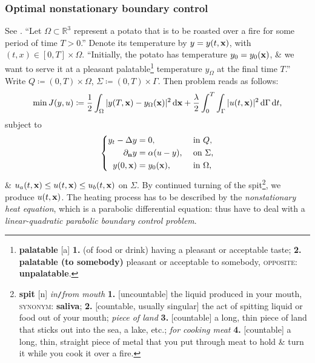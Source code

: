 \documentclass[oneside]{book}
\numberwithin{equation}{section}
\begin{document}
\subsubsection{Optimal nonstationary boundary control}
See \cite[pp. 5--6]{Troltzsch2010}. ``Let $\Omega\subset\mathbb{R}^3$ represent a potato that is to be roasted over a fire for some period of time $T > 0$.'' Denote its temperature by $y = y(t,{\bf x})$, with $(t,x)\in[0,T]\times\Omega$. ``Initially, the potato has temperature $y_0 = y_0({\bf x})$, \& we want to serve it at a pleasant palatable\footnote{\textbf{palatable} [a] \textbf{1.} (of food or drink) having a pleasant or acceptable taste; \textbf{2.} \textbf{palatable (to somebody)} pleasant or acceptable to somebody, \textsc{opposite}: \textbf{unpalatable}.} temperature $y_\Omega$ at the final time $T$.'' Write $Q\coloneqq(0,T)\times\Omega$, $\Sigma\coloneqq(0,T)\times\Gamma$. Then problem reads as follows:
\begin{align*}
	\min J(y,u)\coloneqq\frac{1}{2}\int_\Omega |y(T,{\bf x}) - y_\Omega({\bf x})|^2\,{\rm d}{\bf x} + \frac{\lambda}{2}\int_0^T\int_\Gamma |u(t,{\bf x})|^2\,{\rm d}\Gamma\,{\rm d}t,
\end{align*}
subject to
\begin{equation*}
	\left\{\begin{split}
		y_t - \Delta y &= 0,&&\mbox{ in } Q,\\
		\partial_{\bf n}y &= \alpha(u - y),&&\mbox{ on }\Sigma,\\
		y(0,{\bf x}) &= y_0({\bf x}),&&\mbox{ in }\Omega,
	\end{split}\right.
\end{equation*}
\& $u_a(t,{\bf x})\le u(t,{\bf x})\le u_b(t,{\bf x})$ on $\Sigma$. By continued turning of the spit\footnote{\textbf{spit} [n] \textit{in}\texttt{/}\textit{from mouth} \textbf{1.} [uncountable] the liquid produced in your mouth, \textsc{synonym}: \textbf{saliva}; \textbf{2.} [countable, usually singular] the act of spitting liquid or food out of your mouth; \textit{piece of land} \textbf{3.} [countable] a long, thin piece of land that sticks out into the sea, a lake, etc.; \textit{for cooking meat} \textbf{4.} [countable] a long, thin, straight piece of metal that you put through meat to hold \& turn it while you cook it over a fire.}, we produce $u(t,{\bf x})$. The heating process has to be described by the \textit{nonstationary heat equation}, which is a parabolic differential equation: thus have to deal with a \textit{linear-quadratic parabolic boundary control problem}.
\end{document}
